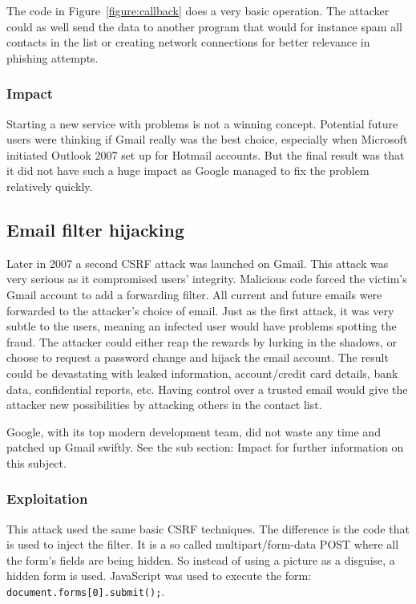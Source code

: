\documentclass[a4paper,11pt,openany]{report}
\begin{document}
  The code in Figure~\ref{figure:callback} does a very basic operation. The attacker could as well send the data to 
  another program that would for instance spam all contacts in the list or creating network connections for better 
  relevance in phishing attempts.
  
  \subsubsection{Impact}
  Starting a new service with problems is not a winning concept. Potential future users were thinking if Gmail 
  really was the best choice, especially when Microsoft initiated Outlook 2007 set up for Hotmail accounts. 
  But the final result was that it did not have such a huge impact as Google managed to fix the problem relatively
  quickly.
  
  \subsection{Email filter hijacking}
  Later in 2007 a second CSRF attack was launched on Gmail. This attack was very serious as it compromised 
  users' integrity. Malicious code forced the victim's Gmail account to add a forwarding filter. All current 
  and future emails were forwarded to the attacker's choice of email. Just as the first attack, it was very 
  subtle to the users, meaning an infected user would have problems spotting the fraud. The attacker could 
  either reap the rewards by lurking in the shadows, or choose to request a password change and hijack the 
  email account. The result could be devastating with leaked information, account/credit card details, bank 
  data, confidential reports, etc. Having control over a trusted email would give the attacker new possibilities 
  by attacking others in the contact list.
  
  Google, with its top modern development team, did not waste any time and patched up Gmail swiftly. See the
  sub section: Impact for further information on this subject.
  
  \subsubsection{Exploitation}
  This attack used the same basic CSRF techniques. The difference is the code that is used to inject the filter.
  It is a so called multipart/form-data POST where all the form's fields are being hidden. So instead of using
  a picture as a disguise, a hidden form is used. JavaScript was used to execute the form: 
  \texttt{document.forms[0].submit();}.
  
\end{document}
